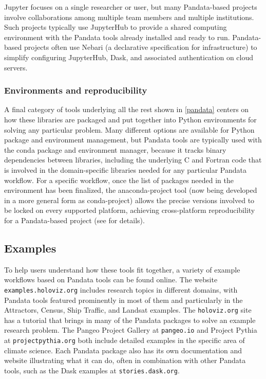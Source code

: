 Jupyter focuses on a single researcher or user, but many Pandata-based projects involve collaborations among multiple team members and multiple institutions. Such projects typically use JupyterHub to provide a shared computing environment with the Pandata tools already installed and ready to run. Pandata-based projects often use Nebari (a declarative specification for infrastructure) to simplify configuring JupyterHub, Dask, and associated authentication on cloud servers.

\subsubsection{Environments and reproducibility} \label{sec:nvironments-and-reproducibility}

A final category of tools underlying all the rest shown in \autoref{pandata} centers on how these libraries are packaged and put together into Python environments for solving any particular problem. Many different options are available for Python package and environment management, but Pandata tools are typically used with the conda package and environment manager, because it tracks binary dependencies between libraries, including the underlying C and Fortran code that is involved in the domain-specific libraries needed for any particular Pandata workflow. For a specific workflow, once the list of packages needed in the environment has been finalized, the anaconda-project tool (now being developed in a more general form as conda-project) allows the precise versions involved to be locked on every supported platform, achieving cross-platform reproducibility for a Pandata-based project (see
\citep{bednar:anaconda22} for details).


\subsection{Examples}

To help users understand how these tools fit together, a variety of example workflows based on Pandata tools can be found online. The website \texttt{examples.holoviz.org} includes research topics in different domains, with Pandata tools featured prominently in most of them and particularly in the Attractors, Census, Ship Traffic, and Landsat examples. The \texttt{holoviz.org} site has a tutorial that brings in many of the Pandata packages to solve an example research problem. The Pangeo Project Gallery at \texttt{pangeo.io} and Project Pythia at \texttt{projectpythia.org} both include detailed examples in the specific area of climate science. Each Pandata package also has its own documentation and website illustrating what it can do, often in combination with other Pandata tools, such as the Dask examples at \texttt{stories.dask.org}.

